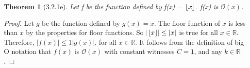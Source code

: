 \documentclass[a4paper, 12pt]{article}
\theoremstyle{plain}
\newtheorem*{theorem*}{Theorem}
\DeclarePairedDelimiter{\floor}{\lfloor}{\rfloor}
\begin{document}
	
	\begin{theorem*}[3.2.1e]
		Let f be the function defined by f(x) = $\floor{x}$. \newline f(x) is $\mathcal{O} (x)$.
	\end{theorem*}
	
	\begin{proof}
		Let $g$ be the function defined by $g(x) = x$. The floor function of $x$ is less than $x$ by the properties for floor functions. So $|\floor{x}| \le |x|$ is true for all $x \in \mathbb{R}$. Therefore, $|f(x)| \le 1|g(x)|$, for all $x \in \mathbb{R}$. It follows from the definition of big-O notation that $f(x)$ is $\mathcal{O} (x)$ with constant witnesses $C = 1$, and any $k \in \mathbb{R}$.
	\end{proof}
\end{document}
